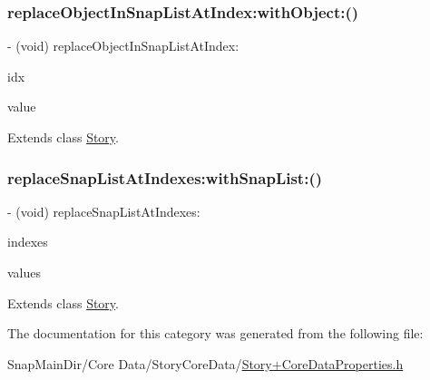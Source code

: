 \subsubsection{\texorpdfstring{replace\+Object\+In\+Snap\+List\+At\+Index\+:with\+Object\+:()}{replaceObjectInSnapListAtIndex:withObject:()}}
{\footnotesize\ttfamily -\/ (void) replace\+Object\+In\+Snap\+List\+At\+Index\+: \begin{DoxyParamCaption}\item[{(N\+S\+U\+Integer)}]{idx }\item[{withObject:(\hyperlink{interface_snap}{Snap} $\ast$)}]{value }\end{DoxyParamCaption}}



Extends class \hyperlink{interface_story_a8e0f8bc62ff304aedad4d3cc99e9398d}{Story}.

\hypertarget{category_story_07_core_data_generated_accessors_08_a4cbef9206e2e91b3fdadd1fd93a722d1}{}\label{category_story_07_core_data_generated_accessors_08_a4cbef9206e2e91b3fdadd1fd93a722d1} 
\subsubsection{\texorpdfstring{replace\+Snap\+List\+At\+Indexes\+:with\+Snap\+List\+:()}{replaceSnapListAtIndexes:withSnapList:()}}
{\footnotesize\ttfamily -\/ (void) replace\+Snap\+List\+At\+Indexes\+: \begin{DoxyParamCaption}\item[{(N\+S\+Index\+Set $\ast$)}]{indexes }\item[{withSnapList:(N\+S\+Array$<$ \hyperlink{interface_snap}{Snap} $\ast$ $>$ $\ast$)}]{values }\end{DoxyParamCaption}}



Extends class \hyperlink{interface_story_a4cbef9206e2e91b3fdadd1fd93a722d1}{Story}.



The documentation for this category was generated from the following file\+:\begin{DoxyCompactItemize}
\item 
Snap\+Main\+Dir/\+Core Data/\+Story\+Core\+Data/\hyperlink{_story_09_core_data_properties_8h}{Story+\+Core\+Data\+Properties.\+h}\end{DoxyCompactItemize}
